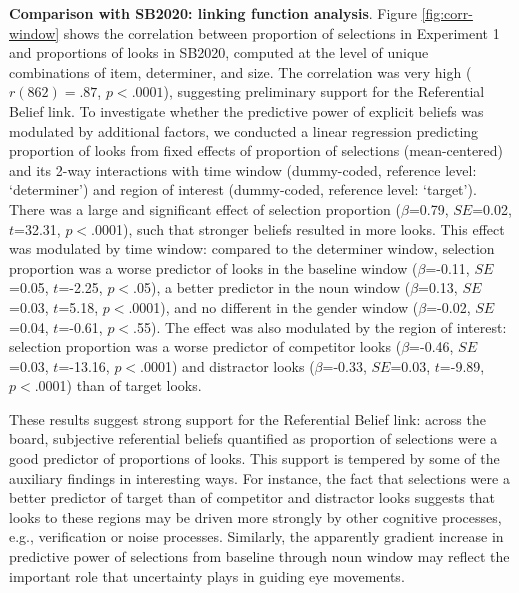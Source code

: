 \documentclass[10pt,letterpaper]{article}
\newcommand{\figref}[1]{Figure \ref{#1}}
\newcommand{\expref}[1]{Experiment #1}
\newcommand{\jd}[1]{\textcolor{Red}{\textbf{[jd: #1]}}}
\begin{document}
\textbf{Comparison with SB2020: linking function analysis}. \figref{fig:corr-window} shows the correlation between  proportion of selections in \expref{1} and proportions of looks in SB2020, computed at the level of unique combinations of item, determiner, and size. The correlation was very high ($r(862) = .87$, $p < .0001$), suggesting preliminary support for the Referential Belief link. To investigate whether the predictive power of explicit beliefs was modulated by additional factors, we conducted a linear regression  %
predicting proportion of looks from fixed effects of proportion of selections (mean-centered) and its 2-way interactions with time window (dummy-coded, reference level: `determiner') and region of interest (dummy-coded, reference level: `target'). There was a large and significant effect of selection proportion  ($\beta$=0.79, $SE$=0.02, $t$=32.31, $p<$.0001), such that stronger beliefs resulted in more looks. This effect was modulated by time window: compared to the determiner window, selection proportion was a worse predictor of looks in the baseline window   ($\beta$=-0.11, $SE$=0.05, $t$=-2.25, $p<$.05), a better predictor in the noun window   ($\beta$=0.13, $SE$=0.03, $t$=5.18, $p<$.0001), and no different in the gender window    ($\beta$=-0.02, $SE$=0.04, $t$=-0.61, $p<$.55). The effect was also modulated by the region of interest: selection proportion was a worse predictor of competitor looks ($\beta$=-0.46, $SE$=0.03, $t$=-13.16, $p<$.0001) and distractor looks  ($\beta$=-0.33, $SE$=0.03, $t$=-9.89, $p<$.0001) than of target looks. %





These results suggest strong support for the Referential Belief link: across the board, subjective referential beliefs quantified as proportion of selections were a good predictor of proportions of looks. This support is tempered by some of the auxiliary findings in interesting ways. For instance, the fact that selections were a better predictor of target than of competitor and distractor looks suggests that looks to these regions may be driven more strongly by other cognitive processes, e.g.,  verification or noise processes. Similarly, the apparently gradient increase in predictive power of selections from baseline through noun window may reflect the important role that uncertainty plays in guiding eye movements.
\end{document}
